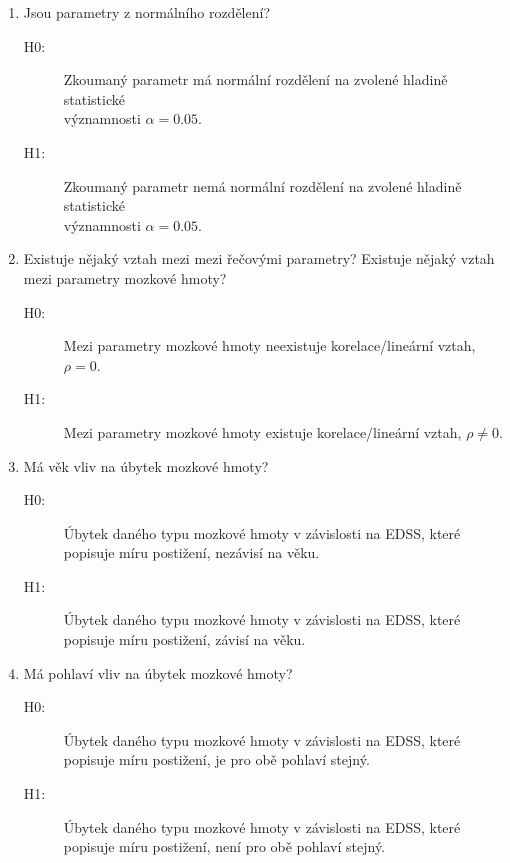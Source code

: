 \documentclass[11pt,a4paper]{article}
\begin{document}
                \begin{enumerate}
                    \item \label{en:normalita}Jsou parametry z normálního rozdělení?
                        \begin{description}
                            \item[H0:] Zkoumaný parametr má normální rozdělení na zvolené hladině statistické\\ významnosti $\alpha = 0.05$.
                            \item[H1:] Zkoumaný parametr nemá normální rozdělení na zvolené hladině statistické \\významnosti $\alpha = 0.05$.
                        \end{description}
                    \item \label{en:korelace}Existuje nějaký vztah mezi mezi řečovými parametry? Existuje nějaký vztah mezi parametry mozkové hmoty?
                        \begin{description}
                            \item[H0:] Mezi parametry mozkové hmoty neexistuje korelace/lineární vztah, $\rho = 0$.
                            \item[H1:] Mezi parametry mozkové hmoty existuje korelace/lineární vztah, $\rho \neq 0$.
                        \end{description}
                    \item \label{en:vek}Má věk vliv na úbytek mozkové hmoty?
                        \begin{description}
                            \item[H0:] Úbytek daného typu mozkové hmoty v závislosti na EDSS, které popisuje míru postižení, nezávisí na věku.
                            \item[H1:] Úbytek daného typu mozkové hmoty v závislosti na EDSS, které popisuje míru postižení, závisí na věku.
                        \end{description}
                    \item \label{en:sex}Má pohlaví vliv na úbytek mozkové hmoty?
                        \begin{description}
                            \item[H0:] Úbytek daného typu mozkové hmoty v závislosti na EDSS, které popisuje míru postižení, je pro obě pohlaví stejný.
                            \item[H1:] Úbytek daného typu mozkové hmoty v závislosti na EDSS, které popisuje míru postižení, není pro obě pohlaví stejný.

\end{description}
\end{enumerate}
\end{document}
